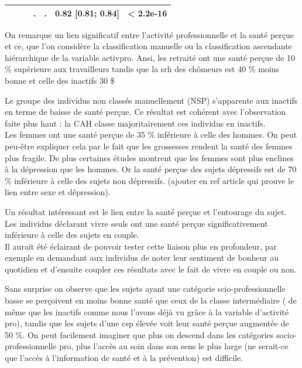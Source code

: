 \documentclass{book}
\begin{document}
\begin{longtable}{lcccc}
 $\qquad$ & .  & .  &0.82 [0.81;  0.84] &  < 2.2e-16 \\ 
    \hline
    \end{longtable} 

\bigskip

\noindent
On remarque un lien significatif entre l'activité professionnelle et la santé perçue et ce, que l'on considère la classification manuelle ou la classification ascendante hiérarchique de la variable activpro. Ansi, les retraité ont une santé perçue de 10 $\%$ supérieure aux travailleurs tandis que la srh des chômeurs est 40 $\%$ moins bonne et celle des inactifs 30 \$%

\noindent
Le groupe des individus non classés manuellement (NSP) s'apparente aux inactifs en terme de baisse de santé perçue. Ce résultat est cohérent avec l'observation faite plus haut : la CAH classe majoritairement ces individus en inactifs.\\
\bigskip
\noindent
Les femmes ont une santé perçue de 35 $\%$ inférieure à celle des hommes. On peut peu-être expliquer cela par le fait que les grossesses rendent la santé des femmes plus fragile. De plus certaines études montrent que les femmes sont plus enclines à la dépression que les hommes. Or la santé perçue des sujets dépressifs est de 70 $\%$ inférieure à celle des sujets non dépressifs. (ajouter en ref article qui prouve le lien entre sexe et dépression).\\
\bigskip

\noindent
Un résultat intéressant est le lien entre la santé perçue et l'entourage du sujet. Les individus déclarant vivre seuls ont une santé perçue significativement inférieure à celle des sujets en couple.\\ Il aurait été éclairant de pouvoir tester cette liaison plus en profondeur, par exemple en demandant aux individus de noter leur sentiment de bonheur au quotidien et d'ensuite coupler ces résultats avec le fait de vivre en couple ou non.\\
\bigskip

\noindent
Sans surprise on observe que les sujets ayant une catégorie scio-professionnelle basse se perçoivent en moins bonne santé que ceux de la classe intermédiaire ( de même que les inactifs comme nous l'avons déjà vu grâce à la variable d'activité pro), tandis que les sujets d'une csp élevée voit leur santé perçue augmentée de 50 $\%$. On peut facilement imaginer que plus on descend dans les catégories socio-professionnelle pro, plus l'accès au soin dans son sens le plus large (ne serait-ce que l'accès à l'information de santé et à la prévention) est difficile.\\
\bigskip
\end{document}
